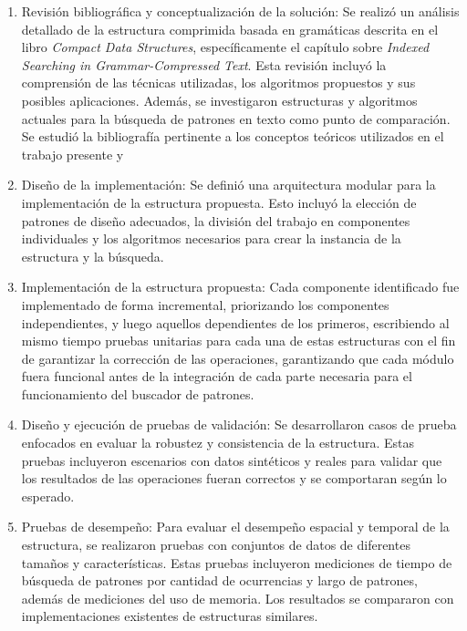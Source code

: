 \begin{enumerate} 
\item Revisión bibliográfica y conceptualización de la solución: 
Se realizó un análisis detallado de la estructura comprimida basada en gramáticas descrita en el libro \textit{Compact Data Structures}, específicamente el capítulo sobre \textit{Indexed Searching in Grammar-Compressed Text}. Esta revisión incluyó la comprensión de las técnicas utilizadas, los algoritmos propuestos y sus posibles aplicaciones. Además, se investigaron estructuras y algoritmos actuales para la búsqueda de patrones en texto como punto de comparación. Se estudió la bibliografía pertinente a los conceptos teóricos utilizados en el trabajo presente y 

\item Diseño de la implementación:
Se definió una arquitectura modular para la implementación de la estructura propuesta. Esto incluyó la elección de patrones de diseño adecuados, la división del trabajo en componentes individuales y los algoritmos necesarios para crear la instancia de la estructura y la búsqueda.

\item Implementación de la estructura propuesta:
Cada componente identificado fue implementado de forma incremental, priorizando los componentes independientes, y luego aquellos dependientes de los primeros, escribiendo al mismo tiempo pruebas unitarias para cada una de estas estructuras con el fin de garantizar la corrección de las operaciones, garantizando que cada módulo fuera funcional antes de la integración de cada parte necesaria para el funcionamiento del buscador de patrones.

\item Diseño y ejecución de pruebas de validación:
Se desarrollaron casos de prueba enfocados en evaluar la robustez y consistencia de la estructura. Estas pruebas incluyeron escenarios con datos sintéticos y reales para validar que los resultados de las operaciones fueran correctos y se comportaran según lo esperado.

\item Pruebas de desempeño:
Para evaluar el desempeño espacial y temporal de la estructura, se realizaron pruebas con conjuntos de datos de diferentes tamaños y características. Estas pruebas incluyeron mediciones de tiempo de búsqueda de patrones por cantidad de ocurrencias y largo de patrones, además de mediciones del uso de memoria. Los resultados se compararon con implementaciones existentes de estructuras similares.


\end{enumerate}

